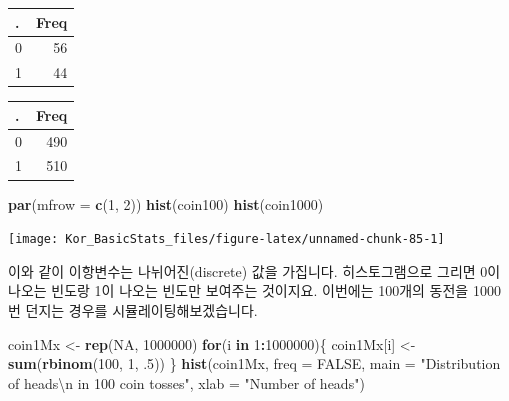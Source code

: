 \documentclass[]{book}
\newenvironment{Shaded}{\begin{snugshade}}{\end{snugshade}}
\newcommand{\CharTok}[1]{\textcolor[rgb]{0.31,0.60,0.02}{#1}}
\newcommand{\CommentTok}[1]{\textcolor[rgb]{0.56,0.35,0.01}{\textit{#1}}}
\newcommand{\ControlFlowTok}[1]{\textcolor[rgb]{0.13,0.29,0.53}{\textbf{#1}}}
\newcommand{\DataTypeTok}[1]{\textcolor[rgb]{0.13,0.29,0.53}{#1}}
\newcommand{\DecValTok}[1]{\textcolor[rgb]{0.00,0.00,0.81}{#1}}
\newcommand{\FloatTok}[1]{\textcolor[rgb]{0.00,0.00,0.81}{#1}}
\newcommand{\KeywordTok}[1]{\textcolor[rgb]{0.13,0.29,0.53}{\textbf{#1}}}
\newcommand{\NormalTok}[1]{#1}
\newcommand{\OperatorTok}[1]{\textcolor[rgb]{0.81,0.36,0.00}{\textbf{#1}}}
\newcommand{\OtherTok}[1]{\textcolor[rgb]{0.56,0.35,0.01}{#1}}
\newcommand{\StringTok}[1]{\textcolor[rgb]{0.31,0.60,0.02}{#1}}
\begin{document}
\begin{tabular}{l|r}
\hline
. & Freq\\
\hline
0 & 56\\
\hline
1 & 44\\
\hline
\end{tabular}

\begin{Shaded}
\end{Shaded}

\begin{tabular}{l|r}
\hline
. & Freq\\
\hline
0 & 490\\
\hline
1 & 510\\
\hline
\end{tabular}

\begin{Shaded}
\begin{Highlighting}[]
\KeywordTok{par}\NormalTok{(}\DataTypeTok{mfrow =} \KeywordTok{c}\NormalTok{(}\DecValTok{1}\NormalTok{, }\DecValTok{2}\NormalTok{))}
\KeywordTok{hist}\NormalTok{(coin100)}
\KeywordTok{hist}\NormalTok{(coin1000)}
\end{Highlighting}
\end{Shaded}

\begin{center}\texttt{[image: Kor\_BasicStats\_files/figure-latex/unnamed-chunk-85-1]} \end{center}

이와 같이 이항변수는 나뉘어진(discrete) 값을 가집니다. 히스토그램으로 그리면 0이 나오는 빈도랑 1이 나오는 빈도만 보여주는 것이지요. 이번에는 100개의 동전을 1000번 던지는 경우를 시뮬레이팅해보겠습니다.

\begin{Shaded}
\begin{Highlighting}[]
\NormalTok{coin1Mx <-}\StringTok{ }\KeywordTok{rep}\NormalTok{(}\OtherTok{NA}\NormalTok{, }\DecValTok{1000000}\NormalTok{)}
\ControlFlowTok{for}\NormalTok{(i }\ControlFlowTok{in} \DecValTok{1}\OperatorTok{:}\DecValTok{1000000}\NormalTok{)\{}
\NormalTok{coin1Mx[i] <-}\StringTok{ }\KeywordTok{sum}\NormalTok{(}\KeywordTok{rbinom}\NormalTok{(}\DecValTok{100}\NormalTok{, }\DecValTok{1}\NormalTok{, }\FloatTok{.5}\NormalTok{))}
\NormalTok{\}}
\KeywordTok{hist}\NormalTok{(coin1Mx, }
     \DataTypeTok{freq =} \OtherTok{FALSE}\NormalTok{, }
     \DataTypeTok{main =} \StringTok{"Distribution of heads}\CharTok{\textbackslash{}n}\StringTok{ in 100 coin tosses"}\NormalTok{, }
     \DataTypeTok{xlab =} \StringTok{"Number of heads"}\NormalTok{)}
\end{Highlighting}
\end{Shaded}
\end{document}
